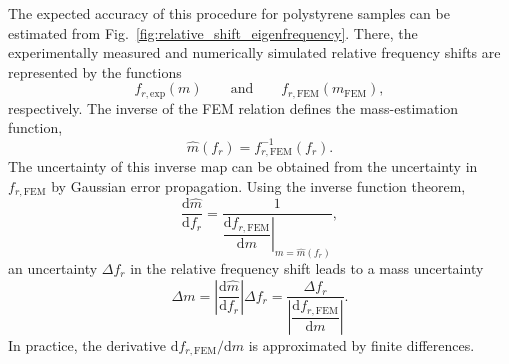 The expected accuracy of this procedure for polystyrene samples can be estimated from Fig.~\ref{fig:relative_shift_eigenfrequency}. There, the experimentally measured and numerically simulated relative frequency shifts are represented by the functions
\begin{equation*}
    f_{r,\mathrm{exp}}(m)
    \qquad \text{and} \qquad
    f_{r,\mathrm{FEM}}(m_\mathrm{FEM}),
\end{equation*}
respectively. The inverse of the FEM relation defines the mass-estimation function,
\begin{equation*}
    \hat m(f_r) = f_{r,\mathrm{FEM}}^{-1}(f_r).
\end{equation*}
The uncertainty of this inverse map can be obtained from the uncertainty in \(f_{r,\mathrm{FEM}}\) by Gaussian error propagation. Using the inverse function theorem,
\begin{equation*}
    \frac{\mathrm d \hat m}{\mathrm d f_r}
    =
    \frac{1}{\left. \dfrac{\mathrm d f_{r,\mathrm{FEM}}}{\mathrm d m} \right|_{m=\hat m(f_r)}} ,
\end{equation*}
an uncertainty \(\Delta f_r\) in the relative frequency shift leads to a mass uncertainty
\begin{equation*}
    \Delta m
    =
    \left|
    \frac{\mathrm d \hat m}{\mathrm d f_r}
    \right|
    \Delta f_r
    =
    \frac{\Delta f_r}
    {\left| \dfrac{\mathrm d f_{r,\mathrm{FEM}}}{\mathrm d m} \right|} .
\end{equation*}
In practice, the derivative \(\mathrm d f_{r,\mathrm{FEM}}/\mathrm d m\) is approximated by finite differences.

